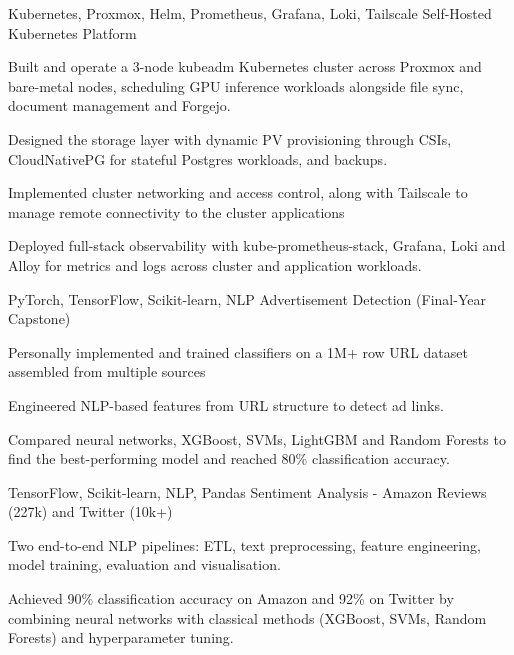 \begin{cventries}
    \cventry
    {Kubernetes, Proxmox, Helm, Prometheus, Grafana, Loki, Tailscale} %
    {Self-Hosted Kubernetes Platform } %
    {}
    {}
    {
    	\begin{cvitems}
    		\item Built and operate a 3-node kubeadm Kubernetes cluster across Proxmox and bare-metal nodes, scheduling GPU inference workloads alongside file sync, document management and Forgejo.
    		\item Designed the storage layer with dynamic PV provisioning through CSIs, CloudNativePG for stateful Postgres workloads, and backups.
    		\item Implemented cluster networking and access control, along with Tailscale to manage remote connectivity to the cluster applications
    		\item Deployed full-stack observability with kube-prometheus-stack, Grafana, Loki and Alloy for metrics and logs across cluster and application workloads.
    	\end{cvitems}
    }
	
	\cventry
	{PyTorch, TensorFlow, Scikit-learn, NLP} %
	{Advertisement Detection (Final-Year Capstone)} %
	{}
	{}
	{
		\begin{cvitems}
			\item Personally implemented and trained classifiers on a 1M+ row URL dataset assembled from multiple sources
			\item Engineered NLP-based features from URL structure to detect ad links.
			\item Compared neural networks, XGBoost, SVMs, LightGBM and Random Forests to find the best-performing model and reached 80\% classification accuracy.
		\end{cvitems}
	}
	
	\cventry
	{TensorFlow, Scikit-learn, NLP, Pandas} %
	{Sentiment Analysis - Amazon Reviews (227k) and Twitter (10k+)} %
	{}
	{}
	{
		\begin{cvitems}
			\item Two end-to-end NLP pipelines: ETL, text preprocessing, feature engineering, model training, evaluation and visualisation.
			\item Achieved 90\% classification accuracy on Amazon and 92\% on Twitter by combining neural networks with classical methods (XGBoost, SVMs, Random Forests) and hyperparameter tuning.
		\end{cvitems}
	}
	

\end{cventries}
